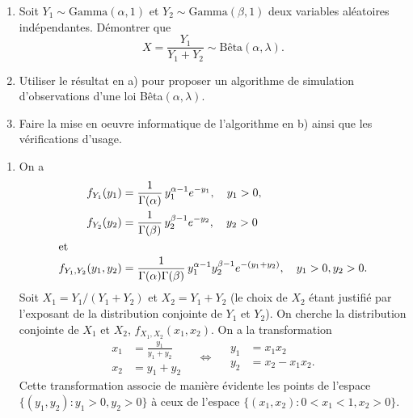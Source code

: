 \begin{exercice}
  \label{ex:simulation:gamma-beta}
  \begin{enumerate}
  \item Soit $Y_1 \sim \text{Gamma}(\alpha, 1)$ et $Y_2 \sim
    \text{Gamma}(\beta, 1)$ deux variables aléatoires
    indépendantes. Démontrer que
    \begin{displaymath}
      X = \frac{Y_1}{Y_1 + Y_2} \sim \text{Bêta}(\alpha, \lambda).
    \end{displaymath}
  \item Utiliser le résultat en a) pour proposer un algorithme de
    simulation d'observations d'une loi Bêta$(\alpha, \lambda)$.
  \item Faire la mise en oeuvre informatique de l'algorithme en b)
    ainsi que les vérifications d'usage.
  \end{enumerate}
  \begin{sol}
    \begin{enumerate}
    \item On a
      \begin{align*}
        f_{Y_1}(y_1)
        &= \frac{1}{\Gamma(\alpha)}\, y_1^{\alpha - 1} e^{-y_1}, \quad
        y_1 > 0, \\
        f_{Y_2}(y_2)
        &= \frac{1}{\Gamma(\beta)}\, y_2^{\beta - 1} e^{-y_2}, \quad
        y_2 > 0 \\
        \intertext{et}
        f_{Y_1, Y_2}(y_1, y_2)
        &= \frac{1}{\Gamma(\alpha) \Gamma(\beta)}\,
        y_1^{\alpha - 1} y_2^{\beta - 1} e^{-(y_1 + y_2)}, \quad
        y_1 > 0, y_2 > 0.
      \end{align*}
      Soit $X_1 = Y_1/(Y_1 + Y_2)$ et $X_2 = Y_1 + Y_2$ (le choix de
      $X_2$ étant justifié par l'exposant de la distribution conjointe
      de $Y_1$ et $Y_2$). On cherche la distribution conjointe de
      $X_1$ et $X_2$, $f_{X_1, X_2}(x_1, x_2)$. On a la transformation
      \begin{displaymath}
        \begin{split}
          x_1 &= \frac{y_1}{y_1 + y_2} \\
          x_2 &= y_1 + y_2
        \end{split}
        \quad \Leftrightarrow \quad
        \begin{split}
          y_1 &= x_1 x_2 \\
          y_2 &= x_2 - x_1 x_2.
        \end{split}
      \end{displaymath}
      Cette transformation associe de manière évidente les points de
      l'espace $\{(y_1, y_2): y_1 > 0, y_2 > 0\}$ à ceux de l'espace
      $\{(x_1, x_2): 0 < x_1 < 1, x_2 > 0\}$.


\end{enumerate}
\end{sol}
\end{exercice}
